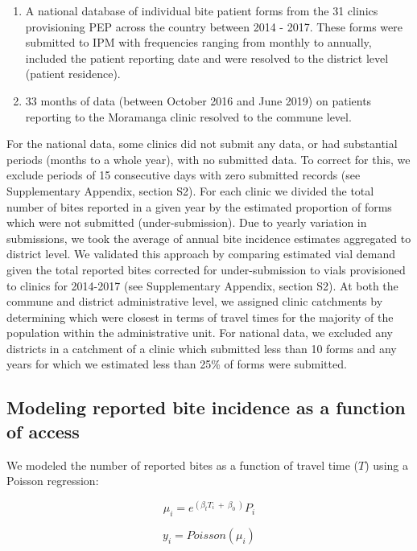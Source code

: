 \documentclass[
]{book}
\begin{document}
\begin{enumerate}
\def\labelenumi{\arabic{enumi})}
\item
  A national database of individual bite patient forms from the 31
  clinics provisioning PEP across the country between 2014 - 2017.
  These forms were submitted to IPM with frequencies ranging from
  monthly to annually, included the patient reporting date and were
  resolved to the district level (patient residence).
\item
  33 months of data (between October 2016 and June 2019) on patients
  reporting to the Moramanga clinic resolved to the commune level.
\end{enumerate}

For the national data, some clinics did not submit any data, or had
substantial periods (months to a whole year), with no submitted data. To
correct for this, we exclude periods of 15 consecutive days with zero
submitted records (see Supplementary Appendix, section S2). For each
clinic we divided the total number of bites reported in a given year by
the estimated proportion of forms which were not submitted
(under-submission). Due to yearly variation in submissions, we took the
average of annual bite incidence estimates aggregated to district level.
We validated this approach by comparing estimated vial demand given the
total reported bites corrected for under-submission to vials provisioned
to clinics for 2014-2017 (see Supplementary Appendix, section S2). At
both the commune and district administrative level, we assigned clinic
catchments by determining which were closest in terms of travel times
for the majority of the population within the administrative unit. For
national data, we excluded any districts in a catchment of a clinic
which submitted less than 10 forms and any years for which we estimated
less than 25\% of forms were submitted.

\hypertarget{modeling-reported-bite-incidence-as-a-function-of-access}{%
\subsection{Modeling reported bite incidence as a function of access}\label{modeling-reported-bite-incidence-as-a-function-of-access}}

We modeled the number of reported bites as a function of travel time
(\(T\)) using a Poisson regression:

\[\mu_{i} = e^{(\beta_{t}T_{i}\  + \ \beta_{0}\ )}P_{i}\]

\[y_{i} = Poisson(\mu_{i})\]
\end{document}
